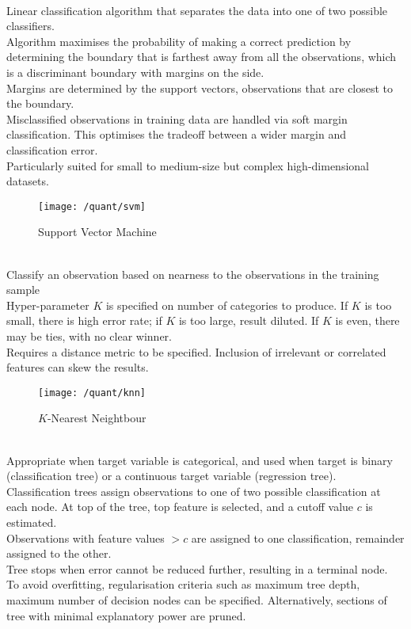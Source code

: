 \begin{definition} \\
Linear classification algorithm that separates the data into one of two possible classifiers.\\
Algorithm maximises the probability of making a correct prediction by determining the boundary that is farthest away from all the observations, which is a discriminant boundary with margins on the side.\\
Margins are determined by the support vectors, observations that are closest to the boundary.\\
Misclassified observations in training data are handled via soft margin classification. This optimises the tradeoff between a wider margin and classification error.\\
Particularly suited for small to medium-size but complex high-dimensional datasets.
\end{definition}

\begin{figure}[H]
\centering
\texttt{[image: /quant/svm]}
\caption{Support Vector Machine}
\end{figure}

\begin{definition} \\
Classify an observation based on nearness to the observations in the training sample\\
Hyper-parameter $K$ is specified on number of categories to produce. If $K$ is too small, there is high error rate; if $K$ is too large, result diluted. If $K$ is even, there may be ties, with no clear winner.\\
Requires a distance metric to be specified. Inclusion of irrelevant or correlated features can skew the results.
\end{definition}

\begin{figure}[H]
\centering
\texttt{[image: /quant/knn]}
\caption{$K$-Nearest Neightbour}
\end{figure}

\begin{definition} \\
Appropriate when target variable is categorical, and used when target is binary (classification tree) or a continuous target variable (regression tree).\\
Classification trees assign observations to one of two possible classification at each node. At top of the tree, top feature is selected, and a cutoff value $c$ is estimated.\\
Observations with feature values $> c$ are assigned to one classification, remainder assigned to the other.\\
Tree stops when error cannot be reduced further, resulting in a terminal node.\\
To avoid overfitting, regularisation criteria such as maximum tree depth, maximum number of decision nodes can be specified. Alternatively, sections of tree with minimal explanatory power are pruned.
\end{definition}


